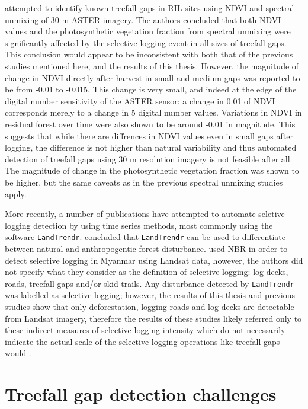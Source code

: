 \documentclass[a4paper,12pt]{scrbook}
\begin{document}
\citet{broadbent_recovery_2006} attempted to identify known treefall gaps in \ac{RIL} sites using \ac{NDVI} and spectral unmixing of 30 m \ac{ASTER} imagery. The authors concluded that both \ac{NDVI} values and the photosynthetic vegetation fraction from spectral unmixing were significantly affected by the selective logging event in all sizes of treefall gaps. This conclusion would appear to be inconsistent with both that of the previous studies mentioned here, and the results of this thesis. However, the magnitude of change in \ac{NDVI} directly after harvest in small and medium gaps was reported to be from -0.01 to -0.015. This change is very small, and indeed at the edge of the digital number sensitivity of the \ac{ASTER} sensor: a change in 0.01 of \ac{NDVI} corresponds merely to a change in 5 digital number values. Variations in \ac{NDVI} in residual forest over time were also shown to be around -0.01 in magnitude. This suggests that while there are diffrences in \ac{NDVI} values even in small gaps after logging, the difference is not higher than natural variability and thus automated detection of treefall gaps using 30 m resolution imagery is not feasible after all. The magnitude of change in the photosynthetic vegetation fraction was shown to be higher, but the same caveats as in the previous spectral unmixing studies apply.

More recently, a number of publications have attempted to automate seletive logging detection by using time series methods, most commonly using the software \texttt{LandTrendr}. \citet{fragal_reconstructing_2016} concluded that \texttt{LandTrendr} can be used to differentiate between natural and anthropogentic forest disturbance. \citet{shimizu_using_2017} used \ac{NBR} in order to detect selective logging in Myanmar using Landsat data, however, the authors did not specify what they consider as the definition of selective logging: log decks, roads, treefall gaps and/or skid trails. Any disturbance detected by \texttt{LandTrendr} was labelled as selective logging; however, the results of this thesis and previous studies show that only deforestation, logging roads and log decks are detectable from Landsat imagery, therefore the results of these studies likely referred only to these indirect measures of selective logging intensity which do not necessarily indicate the actual scale of the selective logging operations like treefall gaps would \citep{frolking_forest_2009}.

\section{Treefall gap detection challenges}
\end{document}
